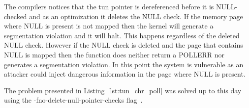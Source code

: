 The compilers notices that the tun pointer is dereferenced before it is
NULL-checked and as an optimization it deletes the NULL check. If the
memory page where NULL is present is not mapped then the kernel will
generate a segmentation violation and it will halt. This happens
regardless of the deleted NULL check. However if the NULL check is
deleted and the page that contains NULL is mapped then the function does
neither return a POLLERR nor generates a segmentation violation. In this
point the system is vulnerable as an attacker could inject dangerous
information in the page where NULL is present.

The problem presented in Listing~\ref{lst:tun_chr_poll} was solved up to
this day using the -fno-delete-null-pointer-checks flag~\cite{funnull}.
